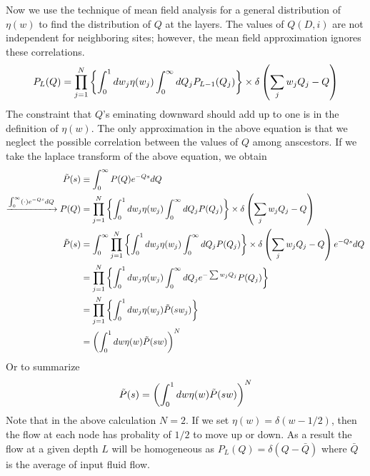 Now we use the technique of mean field analysis for a general
distribution of $\eta(w)$ to find the distribution of $Q$ at the
layers. The values of $Q(D,i)$ are not independent for neighboring
sites; however, the mean field approximation ignores these
correlations.
%
\begin{align}
  P_L (Q) = \prod_{j=1}^N \left\{ \int_0^1 d w_j \eta(w_j) \int_0^{\infty} dQ_j P_{L-1}(Q_j)\right\} \times \delta \left( \sum_j w_j Q_{j} - Q \right)
\end{align}
%
The constraint that $Q$'s eminating downward should add up to one is
in the definition of $\eta(w)$. The only approximation in the above
equation is that we neglect the possible correlation between the
values of $Q$ among anscestors. If we take the laplace transform of
the above equation, we obtain
%
\begin{align}
  \tilde P(s) & \equiv \int_0^{\infty} P(Q) e^{-Qs} dQ\\
  \xrightarrow{\int_0^{\infty} (\cdot) e^{-Qs} dQ}  P (Q) & = \prod_{j=1}^N \left\{ \int_0^1 d w_j \eta(w_j) \int_0^{\infty} dQ_j P(Q_j)\right\} \times \delta \left( \sum_j w_j Q_{j} - Q \right) \\
  \tilde P(s) & = \int_0^{\infty} \prod_{j=1}^N \left\{ \int_0^1 d w_j \eta(w_j) \int_0^{\infty} dQ_j P(Q_j)\right\} \times \delta \left( \sum_j w_j Q_{j} - Q \right) e^{-Qs}dQ \\
              & = \prod_{j=1}^N \left\{ \int_0^1 d w_j \eta(w_j) \int_0^{\infty} dQ_j e^{-\sum w_{j}Q_{j}} P(Q_j)\right\}   \\
              & = \prod_{j=1}^N \left\{ \int_0^1 d w_j \eta(w_j) \tilde P(s w_j) \right\} \\
  & = \left(  \int_0^1 d w \eta(w) \tilde P(s w)  \right)^{N}
\end{align}
%
Or to summarize
%
\begin{align}
  \tilde P(s) = \left(  \int_0^1 d w \eta(w) \tilde P(s w)  \right)^{N} \label{eq:main-laplace}
\end{align}
%
Note that in the above calculation $N=2$. If we set $\eta(w) =
\delta(w-1/2)$, then the flow at each node has probality of $1/2$ to
move up or down. As a result the flow at a given depth $L$ will be
homogeneous as $P_L(Q) = \delta (Q-\bar{Q})$ where $\bar{Q}$ is the
average of input fluid flow.

